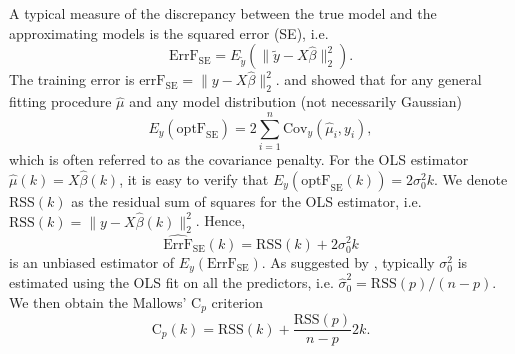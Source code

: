 A typical measure of the discrepancy between the true model and the approximating models is the squared error (SE), i.e. 
\begin{equation*}
\text{ErrF}_\text{SE} = E_{\tilde{y}}\left( \lVert \tilde{y}-X\hat{\beta} \rVert_2^2 \right).
\end{equation*} 
The training error is $\text{errF}_\text{SE} = \displaystyle \lVert y-X\hat{\beta} \rVert_2^2$. \citet{ye1998measuring} and \citet{efron2004estimation} showed that for any general fitting procedure $\hat\mu$ and any model distribution (not necessarily Gaussian)
\begin{equation}
E_y(\text{optF}_\text{SE}) = 2\sum_{i=1}^n \text{Cov}_y(\hat\mu_i,y_i),
\label{eq:EoptF_SE}
\end{equation}
which is often referred to as the covariance penalty. For the OLS estimator $\hat\mu(k) = X\hat\beta(k)$, it is easy to verify that $E_y(\text{optF}_\text{SE}(k)) = 2 \sigma_0^2 k$. We denote RSS$(k)$ as the residual sum of squares for the OLS estimator, i.e. $\text{RSS}(k)=\lVert y- X\hat\beta(k) \rVert_2^2$. Hence,
\begin{equation*}
\widehat{\text{ErrF}}_\text{SE}(k) = \text{RSS}(k) + 2 \sigma_0^2 k
\end{equation*}
is an unbiased estimator of $E_y(\text{ErrF}_\text{SE})$. As suggested by \citet{mallows1973some}, typically $\sigma_0^2$ is estimated using the OLS fit on all the predictors, i.e. $\hat\sigma_0^2=\text{RSS}(p)/(n-p)$. We then obtain the Mallows' C$_p$ criterion \citep{mallows1973some} 
\begin{equation}
\text{C}_p(k) = \text{RSS}(k) + \frac{\text{RSS}(p)}{n-p} 2k.
\label{eq:cp_subsetselection}
\end{equation}

